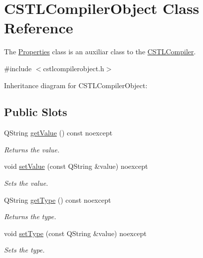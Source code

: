 \hypertarget{class_c_s_t_l_compiler_object}{}\section{C\+S\+T\+L\+Compiler\+Object Class Reference}
\label{class_c_s_t_l_compiler_object}


The \hyperlink{class_properties}{Properties} class is an auxiliar class to the \hyperlink{class_c_s_t_l_compiler}{C\+S\+T\+L\+Compiler}.  




{\ttfamily \#include $<$cstlcompilerobject.\+h$>$}



Inheritance diagram for C\+S\+T\+L\+Compiler\+Object\+:
\subsection*{Public Slots}
\begin{DoxyCompactItemize}
\item 
Q\+String \hyperlink{class_c_s_t_l_compiler_object_ae09aa0cd4fe3da1d07cec05f734d2fab}{get\+Value} () const noexcept
\begin{DoxyCompactList}\small\item\em Returns the value. \end{DoxyCompactList}\item 
void \hyperlink{class_c_s_t_l_compiler_object_ad16e7e9c49e97375c6af683f94c550d2}{set\+Value} (const Q\+String \&value) noexcept
\begin{DoxyCompactList}\small\item\em Sets the value. \end{DoxyCompactList}\item 
Q\+String \hyperlink{class_c_s_t_l_compiler_object_a99e470396326c2895ffc63a5bc233add}{get\+Type} () const noexcept
\begin{DoxyCompactList}\small\item\em Returns the type. \end{DoxyCompactList}\item 
void \hyperlink{class_c_s_t_l_compiler_object_aa085b545107f3a4a6a06e73353e30b5b}{set\+Type} (const Q\+String \&value) noexcept
\begin{DoxyCompactList}\small\item\em Sets the type. \end{DoxyCompactList}\end{DoxyCompactItemize}
